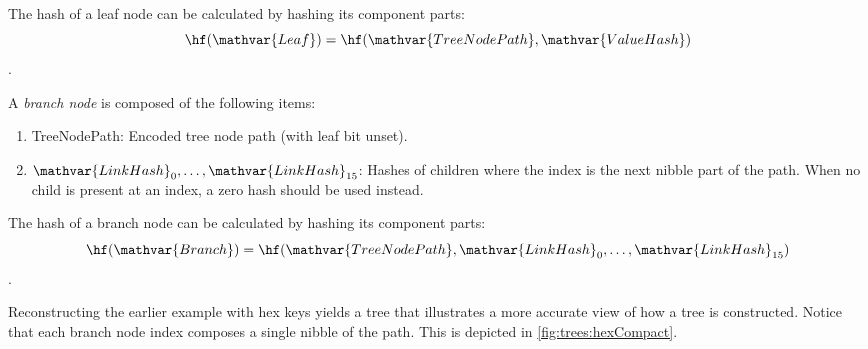 The hash of a leaf node can be calculated by hashing its component parts:
$$\hf(\mathvar{Leaf}) = \hf(\mathvar{TreeNodePath}, \mathvar{ValueHash})$$.

A \emph{branch node} is composed of the following items:
\begin{enumerate}
	\item{TreeNodePath: Encoded tree node path (with leaf bit unset).}
	\item{
		$\mathvar{LinkHash}_{0}, \ldots, \mathvar{LinkHash}_{15}$: Hashes of children where the index is the next nibble part of the path.
		When no child is present at an index, a zero hash should be used instead.
	}
\end{enumerate}

The hash of a branch node can be calculated by hashing its component parts:
$$\hf(\mathvar{Branch}) = \hf(\mathvar{TreeNodePath}, \mathvar{LinkHash}_0,\ldots,\mathvar{LinkHash}_{15})$$.

Reconstructing the earlier example with hex keys yields a tree that illustrates a more accurate view of how a \codenamespace tree is constructed.
Notice that each branch node index composes a single nibble of the path.
This is depicted in \autoref{fig:trees:hexCompact}.

\begin{figure}[ht]
\end{figure}

